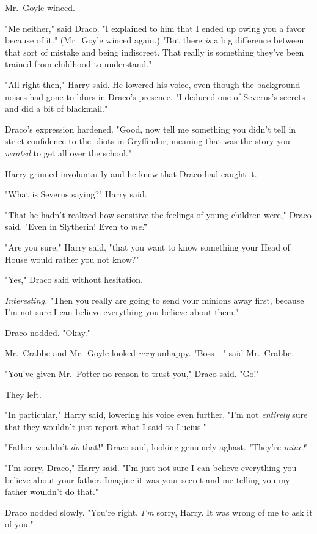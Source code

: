 Mr.~Goyle winced.

"Me neither," said Draco. "I explained to him that I ended up owing you a favor because of it." (Mr.~Goyle winced again.) "But there \emph{is} a big difference between that sort of mistake and being indiscreet. That really is something they've been trained from childhood to understand."

"All right then," Harry said. He lowered his voice, even though the background noises had gone to blurs in Draco's presence. "I deduced one of Severus's secrets and did a bit of blackmail."

Draco's expression hardened. "Good, now tell me something you didn't tell in strict confidence to the idiots in Gryffindor, meaning that was the story you \emph{wanted} to get all over the school."

Harry grinned involuntarily and he knew that Draco had caught it.

"What is Severus saying?" Harry said.

"That he hadn't realized how sensitive the feelings of young children were," Draco said. "Even in Slytherin! Even to \emph{me!}"

"Are you sure," Harry said, "that you want to know something your Head of House would rather you not know?"

"Yes," Draco said without hesitation.

\emph{Interesting.} "Then you really are going to send your minions away first, because I'm not sure I can believe everything you believe about them."

Draco nodded. "Okay."

Mr.~Crabbe and Mr.~Goyle looked \emph{very} unhappy. "Boss---" said Mr.~Crabbe.

"You've given Mr.~Potter no reason to trust you," Draco said. "Go!"

They left.

"In particular," Harry said, lowering his voice even further, "I'm not \emph{entirely} sure that they wouldn't just report what I said to Lucius."

"Father wouldn't \emph{do} that!" Draco said, looking genuinely aghast. "They're \emph{mine!}"

"I'm sorry, Draco," Harry said. "I'm just not sure I can believe everything you believe about your father. Imagine it was your secret and me telling you my father wouldn't do that."

Draco nodded slowly. "You're right. \emph{I'm} sorry, Harry. It was wrong of me to ask it of you."

